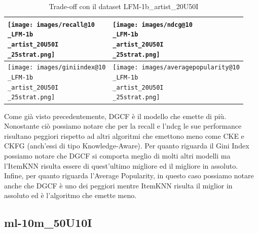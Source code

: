 \begin{table}[H]
    \centering
    \footnotesize
    \setlength\tabcolsep{0pt}
    \begin{tabularx}{\textwidth}{|X|X|}
        \hline
        \texttt{[image: images/recall@10\\\_LFM-1b\\\_artist\_20U50I\\\_25strat.png]} &
        \texttt{[image: images/ndcg@10\\\_LFM-1b\\\_artist\_20U50I\\\_25strat.png]} \\
        \hline
        \texttt{[image: images/giniindex@10\\\_LFM-1b\\\_artist\_20U50I\\\_25strat.png]} &
        \texttt{[image: images/averagepopularity@10\\\_LFM-1b\\\_artist\_20U50I\\\_25strat.png]} \\
        \hline
    \end{tabularx}
    \caption{Trade-off con il dataset LFM-1b\_artist\_20U50I}
    \label{tab:emissions_info}
\end{table}


\noindent Come già visto precedentemente, DGCF è il modello che emette di più. Nonostante ciò possiamo notare che per la recall e l'ndcg le sue performance risultano peggiori rispetto ad altri algoritmi che emettono meno come CKE e CKFG (anch'essi di tipo Knowledge-Aware).
Per quanto riguarda il Gini Index possiamo notare che DGCF si comporta meglio di molti altri modelli ma l'ItemKNN risulta essere di quest'ultimo migliore ed il migliore in assoluto.
Infine, per quanto riguarda l'Average Popularity, in questo caso possiamo notare anche che DGCF è uno dei peggiori mentre ItemKNN risulta il miglior in assoluto ed è l'algoritmo che emette meno.


\subsection{ml-10m\_50U10I}


